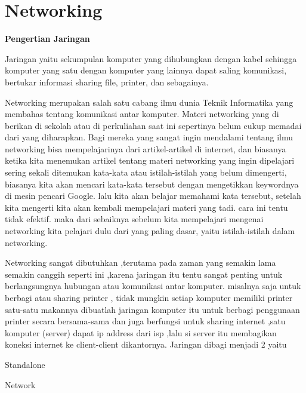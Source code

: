\documentclass{wileySix}
\begin{document}
\chapter{Networking}
 \par
\noindent 
\textbf{Pengertian Jaringan} \par
Jaringan yaitu sekumpulan komputer yang dihubungkan dengan kabel sehingga komputer yang satu dengan komputer yang lainnya dapat saling komunikasi, bertukar informasi sharing file, printer, dan sebagainya. \par
\vspace{12pt}
Networking merupakan salah satu cabang ilmu dunia Teknik Informatika yang membahas tentang komunikasi antar komputer. Materi networking yang di berikan di sekolah atau di perkuliahan saat ini sepertinya belum cukup memadai dari yang diharapkan. Bagi mereka yang sangat ingin mendalami tentang ilmu networking bisa mempelajarinya dari artikel-artikel di internet, dan biasanya ketika kita menemukan artikel tentang materi networking yang ingin dipelajari sering sekali ditemukan kata-kata atau istilah-istilah yang belum dimengerti, biasanya kita akan mencari kata-kata tersebut dengan mengetikkan keywordnya di mesin pencari Google. lalu kita akan belajar memahami kata tersebut, setelah kita mengerti kita akan kembali mempelajari materi yang tadi. cara ini tentu tidak efektif. maka dari sebaiknya sebelum kita mempelajari mengenai networking kita pelajari dulu dari yang paling dasar, yaitu istilah-istilah dalam networking. \par
\vspace{12pt}
Networking sangat dibutuhkan ,terutama pada zaman yang semakin lama semakin canggih seperti ini ,karena jaringan itu tentu sangat penting untuk berlangsungnya hubungan atau komunikasi antar komputer. misalnya saja untuk berbagi atau sharing printer , tidak mungkin setiap komputer memiliki printer satu-satu makannya dibuatlah jaringan komputer itu untuk berbagi penggunaan printer secara bersama-sama dan juga berfungsi untuk sharing internet ,satu komputer (server) dapat ip address dari isp ,lalu si server itu membagikan koneksi internet ke client-client dikantornya. Jaringan dibagi menjadi 2 yaitu \par
\noindent 
\begin{myEnumerate}
	\item Standalone \par
	\noindent 
	\item Network\end{myEnumerate}
\par
\end{document}
